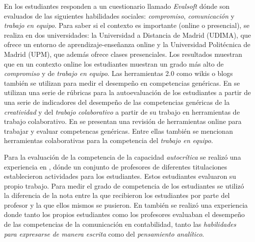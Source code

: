 En \cite{ruizacarate2013soft} los estudiantes responden a un cuestionario llamado \emph{Evalsoft} dónde son evaluados de las siguientes habilidades sociales: \emph{compromiso}, \emph{comunicación} y \emph{trabajo en equipo}. Para saber si el contexto es importante (online o presencial), se realiza en dos universidades: la Universidad a Distancia de Madrid (UDIMA), que ofrece un entorno de aprendizaje-enseñanza online y la Universidad Politécnica de Madrid (UPM), que además ofrece clases presenciales. Los resultados muestran que en un contexto online los estudiantes muestran un grado más alto de \emph{compromiso} y de \emph{trabajo en equipo}. Las herramientas 2.0 como wikis o blogs también se utilizan para medir el desempeño en competencias genéricas. En \cite{piedra2010measuring} se utilizan una serie de rúbricas para la autoevaluación de los estudiantes a partir de una serie de indicadores del desempeño de las competencias genéricas de la \emph{creatividad} y del \emph{trabajo colaborativo} a partir de su trabajo en herramientas de trabajo colaborativo. En \cite{mcloughlin2006beyond} se presentan una revisión de herramientas online para trabajar y evaluar competencas genéricas. Entre ellas también se mencionan herramientas colaborativas para la competencia del \emph{trabajo en equipo}. 

Para la evaluación de la competencia de la capacidad \emph{autocrítica} se realizó una experiencia en \cite{pinto2011assessment}, dónde un conjunto de profesores de diferentes titulaciones establecieron actividades para los estudiantes. Estos estudiantes evaluaron su propio trabajo. Para medir el grado de competencia de los estudiantes se utilizó la diferencia de la nota entre la que recibieron los estudiantes por parte del profesor y la que ellos mismos se pusieron. En \cite{sin2007evaluating} también se realizó una experiencia donde tanto los propios estudiantes como los profesores evaluaban el desempeño de las competencias de la comunicación en contabilidad, tanto las \emph{habilidades para expresarse de manera escrita} como del \emph{pensamiento analítico}.

